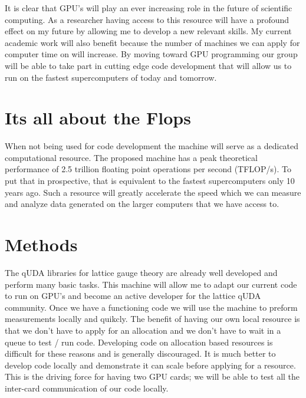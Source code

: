 \documentclass[11pt]{article}
\begin{document}
  It is clear that GPU's will play an ever increasing role in the future of scientific computing.
  As a researcher having access to this resource will have a profound effect on my future by allowing me to develop a new relevant skills.
  My current academic work will also benefit because the number of machines we can apply for computer time on will increase.
  By moving toward GPU programming our group will be able to take part in cutting edge code development that will allow us to run on the fastest supercomputers of today and tomorrow.

  \section*{Its all about the Flops} %
  When not being used for code development the machine will serve as a dedicated computational resource.  
  The proposed machine has a peak theoretical performance of 2.5 trillion floating point operations per second (TFLOP/s).
  To put that in prospective, that is equivalent to the fastest supercomputers only 10 years ago.
  Such a resource will greatly accelerate the speed which we can measure and analyze data generated on the larger computers that we have access to.

  \section*{Methods} %
  The qUDA libraries for lattice gauge theory are already well developed and perform many basic tasks.
  This machine will allow me to adapt our current code to run on GPU's and become an active developer for the lattice qUDA community.
  Once we have a functioning code we will use the machine to preform measurements locally and quikcly.
  The benefit of having our own local resource is that we don't have to apply for an allocation and we don't have to wait in a queue to test / run code.
  Developing code on allocation based resources is difficult for these reasons and is generally discouraged.
  It is much better to develop code locally and demonstrate it can scale before applying for a resource.
  This is the driving force for having two GPU cards; we will be able to test all the inter-card communication of our code locally.
  
\end{document}
